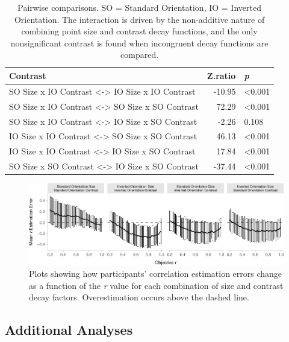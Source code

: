\documentclass[manuscript, review, anonymous, screen]{acmart}
\begin{document}
\hypertarget{tbl-contrasts}{}
\begin{table}
\caption{\label{tbl-contrasts}Pairwise comparisons. SO = Standard Orientation, IO = Inverted
Orientation. The interaction is driven by the non-additive nature of
combining point size and contrast decay functions, and the only
nonsignificant contrast is found when incongruent decay functions are
compared. }\tabularnewline

\centering
\begin{tabular}{lrl}
\toprule
Contrast & Z.ratio & \textit{p}\\
\midrule
SO Size x IO Contrast <-> IO Size x IO Contrast & -10.95 & <0.001\\
SO Size x IO Contrast <-> SO Size x SO Contrast & 72.29 & <0.001\\
SO Size x IO Contrast <-> IO Size x SO Contrast & -2.26 & 0.108\\
IO Size x IO Contrast <-> SO Size x SO Contrast & 46.13 & <0.001\\
IO Size x IO Contrast <-> IO Size x SO Contrast & 17.84 & <0.001\\
\addlinespace
SO Size x SO Contrast <-> IO Size x SO Contrast & -37.44 & <0.001\\
\bottomrule
\end{tabular}
\end{table}

\begin{figure}

{\centering \includegraphics[width=1\textwidth,height=\textheight]{size_and_contrast_files/figure-pdf/fig-diff-error-bars-plot-1.pdf}

}

\caption{\label{fig-diff-error-bars-plot}Plots showing how participants'
correlation estimation errors change as a function of the \emph{r} value
for each combination of size and contrast decay factors. Overestimation
occurs above the dashed line.}

\end{figure}

\hypertarget{sec-add-analyses}{%
\subsection{Additional Analyses}\label{sec-add-analyses}}
\end{document}
